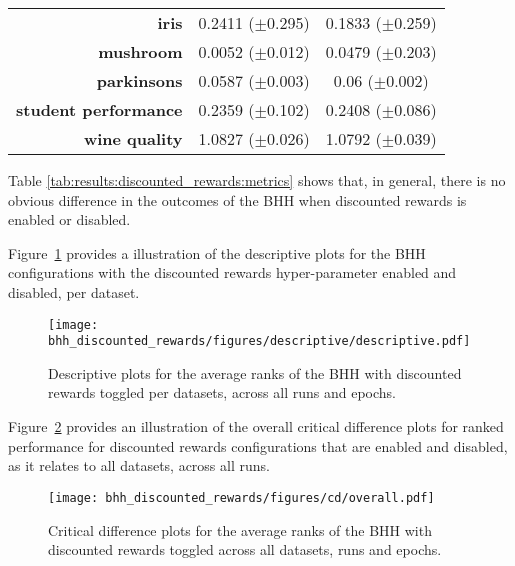 \begin{table}[htbp]
{\begin{tabular}{r|cc}
			\textbf{iris}                & \cellcolor[rgb]{ .973,  .412,  .42}0.2411 ($\pm$0.295)         & \cellcolor[rgb]{ .388,  .745,  .482}0.1833 ($\pm$0.259) \\
			\textbf{mushroom}            & \cellcolor[rgb]{ .388,  .745,  .482}0.0052 ($\pm$0.012)        & \cellcolor[rgb]{ .973,  .412,  .42}0.0479 ($\pm$0.203)  \\
			\textbf{parkinsons}          & \cellcolor[rgb]{ .388,  .745,  .482}0.0587 ($\pm$0.003)        & \cellcolor[rgb]{ .973,  .412,  .42}0.06 ($\pm$0.002)    \\
			\textbf{student performance} & \cellcolor[rgb]{ .388,  .745,  .482}0.2359 ($\pm$0.102)        & \cellcolor[rgb]{ .973,  .412,  .42}0.2408 ($\pm$0.086)  \\
			\textbf{wine quality}        & \cellcolor[rgb]{ .973,  .412,  .42}1.0827 ($\pm$0.026)         & \cellcolor[rgb]{ .388,  .745,  .482}1.0792 ($\pm$0.039) \\
		\end{tabular}%


	}
\end{table}%

Table \ref{tab:results:discounted_rewards:metrics} shows that, in general, there is no obvious difference in the outcomes of the \acs{BHH} when discounted rewards is enabled or disabled.

Figure~\ref{fig:results:discounted_rewards:descriptive:descriptive} provides a illustration of the descriptive plots for the \acs{BHH} configurations with the discounted rewards hyper-parameter enabled and disabled, per dataset.

\begin{figure}[htbp]
	\centering
	\texttt{[image: bhh\_discounted\_rewards/figures/descriptive/descriptive.pdf]}
	\caption{Descriptive plots for the average ranks of the \acs{BHH} with discounted rewards toggled per datasets, across all runs and epochs.}
	\label{fig:results:discounted_rewards:descriptive:descriptive}
\end{figure}

Figure~\ref{fig:results:discounted_rewards:descriptive:cd} provides an illustration of the overall critical difference plots for ranked performance for discounted rewards configurations that are enabled and disabled, as it relates to all datasets, across all runs.

\begin{figure}[htbp]
	\centering
	\texttt{[image: bhh\_discounted\_rewards/figures/cd/overall.pdf]}
	\caption{Critical difference plots for the average ranks of the \acs{BHH} with discounted rewards toggled across all datasets, runs and epochs.}
	\label{fig:results:discounted_rewards:descriptive:cd}
\end{figure}

